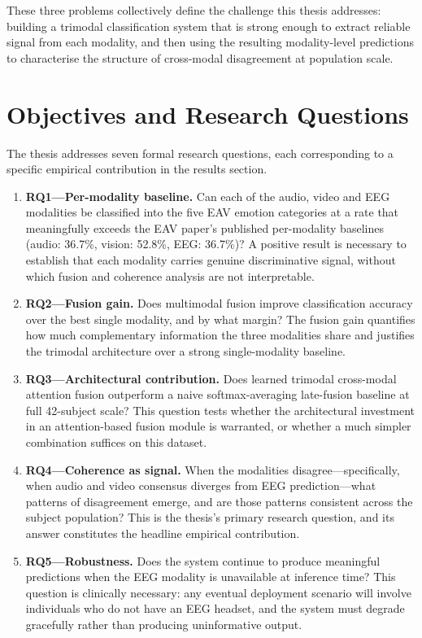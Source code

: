 These three problems collectively define the challenge this thesis addresses: building a trimodal classification system that is strong enough to extract reliable signal from each modality, and then using the resulting modality-level predictions to characterise the structure of cross-modal disagreement at population scale.

\section{Objectives and Research Questions}
The thesis addresses seven formal research questions, each corresponding to a specific empirical contribution in the results section.

\begin{enumerate}
    \item \textbf{RQ1---Per-modality baseline.} Can each of the audio, video and EEG modalities be classified into the five EAV emotion categories at a rate that meaningfully exceeds the EAV paper's published per-modality baselines (audio: 36.7\%, vision: 52.8\%, EEG: 36.7\%)? A positive result is necessary to establish that each modality carries genuine discriminative signal, without which fusion and coherence analysis are not interpretable.
    \item \textbf{RQ2---Fusion gain.} Does multimodal fusion improve classification accuracy over the best single modality, and by what margin? The fusion gain quantifies how much complementary information the three modalities share and justifies the trimodal architecture over a strong single-modality baseline.
    \item \textbf{RQ3---Architectural contribution.} Does learned trimodal cross-modal attention fusion outperform a naive softmax-averaging late-fusion baseline at full 42-subject scale? This question tests whether the architectural investment in an attention-based fusion module is warranted, or whether a much simpler combination suffices on this dataset.
    \item \textbf{RQ4---Coherence as signal.} When the modalities disagree---specifically, when audio and video consensus diverges from EEG prediction---what patterns of disagreement emerge, and are those patterns consistent across the subject population? This is the thesis's primary research question, and its answer constitutes the headline empirical contribution.
    \item \textbf{RQ5---Robustness.} Does the system continue to produce meaningful predictions when the EEG modality is unavailable at inference time? This question is clinically necessary: any eventual deployment scenario will involve individuals who do not have an EEG headset, and the system must degrade gracefully rather than producing uninformative output.

\end{enumerate}
